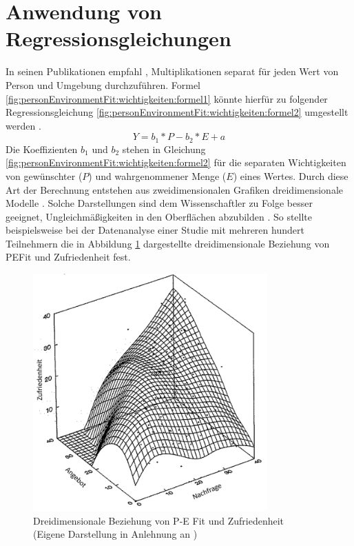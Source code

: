 \section{Anwendung von Regressionsgleichungen}
\label{ch:personEnvironmentFit:regressionsgleichungen}
In seinen Publikationen empfahl \textcite[S. 51ff.]{edwards:1991}\cite[S. 9ff.]{edwards:1990}\cite[S. 2ff.]{edwards:1993}\cite[S. 2ff.]{edwards:1993b}, Multiplikationen separat für jeden Wert von Person und Umgebung durchzuführen. Formel \ref{fig:personEnvironmentFit:wichtigkeiten:formel1} könnte hierfür zu folgender Regressionsgleichung \ref{fig:personEnvironmentFit:wichtigkeiten:formel2} umgestellt werden \cite[S. 9f.]{edwards:1990}\cite[S. 2f.]{edwards:1993b}.
\begin{equation}
	Y = b_1 * P - b_2 * E + a
	\label{fig:personEnvironmentFit:wichtigkeiten:formel2}
\end{equation}
Die Koeffizienten $b_1$ und $b_2$ stehen in Gleichung \ref{fig:personEnvironmentFit:wichtigkeiten:formel2} für die separaten Wichtigkeiten von gewünschter ($P$) und wahrgenommener Menge ($E$) eines Wertes. Durch diese Art der Berechnung entstehen aus zweidimensionalen Grafiken dreidimensionale Modelle \cite[S. 2]{edwards:1993}. Solche Darstellungen sind dem Wissenschaftler zu Folge besser geeignet, Ungleichmäßigkeiten in den Oberflächen abzubilden \cite[S. 51ff.]{edwards:1991}. So stellte \textcite[S. 53ff.]{edwards:1991} beispielsweise bei der Datenanalyse einer Studie mit mehreren hundert Teilnehmern die in Abbildung \ref{fig:personEnvironmentFit:wichtigkeiten:abb2} dargestellte dreidimensionale Beziehung von \ac{PEFit} und Zufriedenheit fest.

\begin{figure}[h]
	\centering
	\includegraphics[width=0.8\textwidth]{gfx/drei_d_modell.png}
	\caption[Dreidimensionale Beziehung von P-E Fit und Zufriedenheit]{Dreidimensionale Beziehung von P-E Fit und Zufriedenheit\\
	(Eigene Darstellung in Anlehnung an \cite[S. 57]{edwards:1991})}
	\label{fig:personEnvironmentFit:wichtigkeiten:abb2}
\end{figure}

